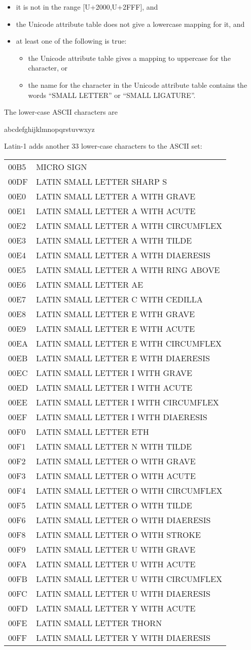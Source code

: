 \begin{itemize}
\tightlist
\item
  it is not in the range {[}U+2000,U+2FFF{]}, and
\item
  the Unicode attribute table does not give a lowercase mapping for it,
  and
\item
  at least one of the following is true:

  \begin{itemize}
  \tightlist
  \item
    the Unicode attribute table gives a mapping to uppercase for the
    character, or
  \item
    the name for the character in the Unicode attribute table contains
    the words ``SMALL LETTER'' or ``SMALL LIGATURE''.
  \end{itemize}
\end{itemize}

The lower-case ASCII characters are

abcdefghijklmnopqrstuvwxyz

Latin-1 adds another 33 lower-case characters to the ASCII set:

\begin{longtable}[]{@{}ll@{}}
\toprule
00B5 & MICRO SIGN\tabularnewline
00DF & LATIN SMALL LETTER SHARP S\tabularnewline
00E0 & LATIN SMALL LETTER A WITH GRAVE\tabularnewline
00E1 & LATIN SMALL LETTER A WITH ACUTE\tabularnewline
00E2 & LATIN SMALL LETTER A WITH CIRCUMFLEX\tabularnewline
00E3 & LATIN SMALL LETTER A WITH TILDE\tabularnewline
00E4 & LATIN SMALL LETTER A WITH DIAERESIS\tabularnewline
00E5 & LATIN SMALL LETTER A WITH RING ABOVE\tabularnewline
00E6 & LATIN SMALL LETTER AE\tabularnewline
00E7 & LATIN SMALL LETTER C WITH CEDILLA\tabularnewline
00E8 & LATIN SMALL LETTER E WITH GRAVE\tabularnewline
00E9 & LATIN SMALL LETTER E WITH ACUTE\tabularnewline
00EA & LATIN SMALL LETTER E WITH CIRCUMFLEX\tabularnewline
00EB & LATIN SMALL LETTER E WITH DIAERESIS\tabularnewline
00EC & LATIN SMALL LETTER I WITH GRAVE\tabularnewline
00ED & LATIN SMALL LETTER I WITH ACUTE\tabularnewline
00EE & LATIN SMALL LETTER I WITH CIRCUMFLEX\tabularnewline
00EF & LATIN SMALL LETTER I WITH DIAERESIS\tabularnewline
00F0 & LATIN SMALL LETTER ETH\tabularnewline
00F1 & LATIN SMALL LETTER N WITH TILDE\tabularnewline
00F2 & LATIN SMALL LETTER O WITH GRAVE\tabularnewline
00F3 & LATIN SMALL LETTER O WITH ACUTE\tabularnewline
00F4 & LATIN SMALL LETTER O WITH CIRCUMFLEX\tabularnewline
00F5 & LATIN SMALL LETTER O WITH TILDE\tabularnewline
00F6 & LATIN SMALL LETTER O WITH DIAERESIS\tabularnewline
00F8 & LATIN SMALL LETTER O WITH STROKE\tabularnewline
00F9 & LATIN SMALL LETTER U WITH GRAVE\tabularnewline
00FA & LATIN SMALL LETTER U WITH ACUTE\tabularnewline
00FB & LATIN SMALL LETTER U WITH CIRCUMFLEX\tabularnewline
00FC & LATIN SMALL LETTER U WITH DIAERESIS\tabularnewline
00FD & LATIN SMALL LETTER Y WITH ACUTE\tabularnewline
00FE & LATIN SMALL LETTER THORN\tabularnewline
00FF & LATIN SMALL LETTER Y WITH DIAERESIS\tabularnewline
\bottomrule
\end{longtable}

